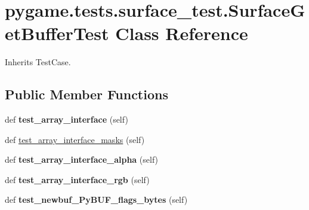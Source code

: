 \hypertarget{classpygame_1_1tests_1_1surface__test_1_1_surface_get_buffer_test}{}\section{pygame.\+tests.\+surface\+\_\+test.\+Surface\+Get\+Buffer\+Test Class Reference}
\label{classpygame_1_1tests_1_1surface__test_1_1_surface_get_buffer_test}


Inherits Test\+Case.

\subsection*{Public Member Functions}
\begin{DoxyCompactItemize}
\item 
\mbox{\label{classpygame_1_1tests_1_1surface__test_1_1_surface_get_buffer_test_af0eabe66eb695bfc8cb48fcee0f7eb0d}} 
def {\bfseries test\+\_\+array\+\_\+interface} (self)
\item 
def \hyperlink{classpygame_1_1tests_1_1surface__test_1_1_surface_get_buffer_test_a818ad7722dd8af52cfc2cd092a8761e9}{test\+\_\+array\+\_\+interface\+\_\+masks} (self)
\item 
\mbox{\label{classpygame_1_1tests_1_1surface__test_1_1_surface_get_buffer_test_a84158a4dc9f03996451cdec8732009b1}} 
def {\bfseries test\+\_\+array\+\_\+interface\+\_\+alpha} (self)
\item 
\mbox{\label{classpygame_1_1tests_1_1surface__test_1_1_surface_get_buffer_test_aba9cbc981326f549e0563e5a9d02e491}} 
def {\bfseries test\+\_\+array\+\_\+interface\+\_\+rgb} (self)
\item 
\mbox{\label{classpygame_1_1tests_1_1surface__test_1_1_surface_get_buffer_test_a6576e5244c5e0ada305732b956cffa98}} 
def {\bfseries test\+\_\+newbuf\+\_\+\+Py\+B\+U\+F\+\_\+flags\+\_\+bytes} (self)
\item 
\mbox{\label{classpygame_1_1tests_1_1surface__test_1_1_surface_get_buffer_test_a86a988eabaa4b12fb9a733ff155736e7}} 

\end{DoxyCompactItemize}
